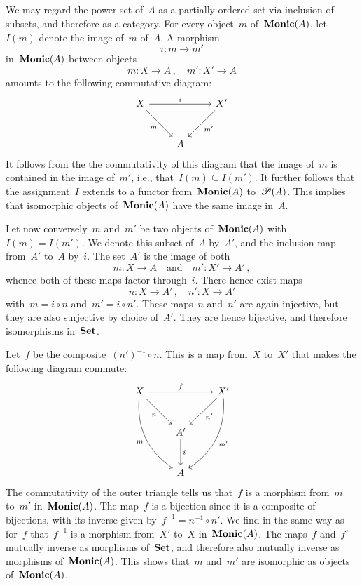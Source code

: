 \subsection{}



\subsubsection{}

We may regard the power set of~$A$ as a partially ordered set via inclusion of subsets, and therefore as a category.
For every object~$m$ of~$\mathbf{Monic}(A)$, let $I(m)$ denote the image of~$m$ of~$A$.
A morphism
\[
	i \colon m \to m'
\]
in~$\mathbf{Monic}(A)$ between objects
\[
	m \colon X \to A \,,
	\quad
	m' \colon X' \to A
\]
amounts to the following commutative diagram:
\[
	\begin{tikzcd}[row sep = large]
		X
		\arrow{rr}[above]{i}
		\arrow{dr}[below left]{m}
		&
		{}
		&
		X'
		\arrow{dl}[below right]{m'}
		\\
		{}
		&
		A
		&
		{}
	\end{tikzcd}
\]
It follows from the the commutativity of this diagram that the image of~$m$ is contained in the image of~$m'$, i.e., that~$I(m) ⊆ I(m')$.
It further follows that the assignment~$I$ extends to a functor from~$\mathbf{Monic}(A)$ to~$\mathscr{P}(A)$.
This implies that isomorphic objects of~$\mathbf{Monic}(A)$ have the same image in~$A$.

Let now conversely~$m$ and~$m'$ be two objects of~$\mathbf{Monic}(A)$ with~$I(m) = I(m')$.
We denote this subset of~$A$ by~$A'$, and the inclusion map from~$A'$ to~$A$ by~$i$.
The set~$A'$ is the image of both
\[
	m \colon X \to A
	\quad\text{and}\quad
	m' \colon X' \to A' \,,
\]
whence both of these maps factor through~$i$.
There hence exist maps
\[
	n \colon X \to A' \,,
	\quad
	n' \colon X \to A'
\]
with~$m = i ∘ n$ and~$m' = i ∘ n'$.
These maps~$n$ and~$n'$ are again injective, but they are also surjective by choice of~$A'$.
They are hence bijective, and therefore isomorphisms in~$\mathbf{Set}$.

Let~$f$ be the composite~$(n')^{-1} ∘ n$.
This is a map from~$X$ to~$X'$ that makes the following diagram commute:
\[
	\begin{tikzcd}[row sep = large]
		X
		\arrow{rr}[above]{f}
		\arrow{dr}[below left]{n}
		\arrow[bend right]{ddr}[below left]{m}
		&
		{}
		&
		X'
		\arrow{dl}[below right]{n'}
		\arrow[bend left]{ddl}[below right]{m'}
		\\
		{}
		&
		A'
		\arrow{d}[right]{i}
		&
		{}
		\\
		{}
		&
		A
		&
		{}
	\end{tikzcd}
\]
The commutativity of the outer triangle tells us that~$f$ is a morphism from~$m$ to~$m'$ in~$\mathbf{Monic}(A)$.
The map~$f$ is a bijection since it is a composite of bijections, with its inverse given by~$f^{-1} = n^{-1} ∘ n'$.
We find in the same way as for~$f$ that~$f^{-1}$ is a morphism from~$X'$ to~$X$ in~$\mathbf{Monic}(A)$.
The maps~$f$ and~$f'$ mutually inverse as morphisms of~$\mathbf{Set}$, and therefore also mutually inverse as morphisms of~$\mathbf{Monic}(A)$.
This shows that~$m$ and~$m'$ are isomorphic as objects of~$\mathbf{Monic}(A)$.



